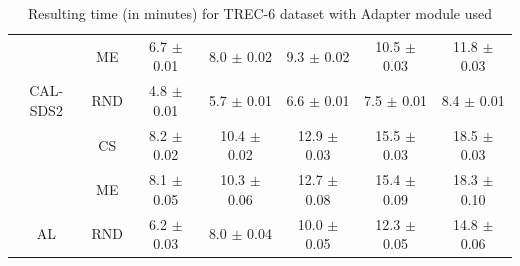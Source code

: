 \begin{table}[htbp]
\begin{tabular*}{\linewidth}{c|c|@{\extracolsep{\fill}}ccccc}
 & ME & 6.7 $\pm$ {\small 0.01} & 8.0 $\pm$ {\small 0.02} & 9.3 $\pm$ {\small 0.02} & 10.5 $\pm$ {\small 0.03} & 11.8 $\pm$ {\small 0.03}\\

\multirow{-3}{*}{\raggedright\arraybackslash CAL-SDS2} & RND & 4.8 $\pm$ {\small 0.01} & 5.7 $\pm$ {\small 0.01} & 6.6 $\pm$ {\small 0.01} & 7.5 $\pm$ {\small 0.01} & 8.4 $\pm$ {\small 0.01}\\
\midrule
 & CS & 8.2 $\pm$ {\small 0.02} & 10.4 $\pm$ {\small 0.02} & 12.9 $\pm$ {\small 0.03} & 15.5 $\pm$ {\small 0.03} & 18.5 $\pm$ {\small 0.03}\\

 & ME & 8.1 $\pm$ {\small 0.05} & 10.3 $\pm$ {\small 0.06} & 12.7 $\pm$ {\small 0.08} & 15.4 $\pm$ {\small 0.09} & 18.3 $\pm$ {\small 0.10}\\

\multirow{-3}{*}{\raggedright\arraybackslash AL} & RND & 6.2 $\pm$ {\small 0.03} & 8.0 $\pm$ {\small 0.04} & 10.0 $\pm$ {\small 0.05} & 12.3 $\pm$ {\small 0.05} & 14.8 $\pm$ {\small 0.06}\\
\bottomrule
\end{tabular*}
\caption{Resulting time (in minutes) for TREC-6 dataset with Adapter module used}
\label{tab:time_full_trec_10_adapter}
\end{table}
